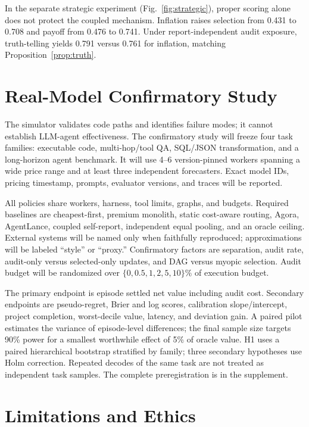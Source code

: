 \documentclass[sigconf,anonymous,review]{acmart}
\begin{document}
In the separate strategic experiment (Fig.~\ref{fig:strategic}), proper scoring
alone does not protect the coupled mechanism. Inflation raises selection from
0.431 to 0.708 and payoff from 0.476 to 0.741. Under report-independent audit
exposure, truth-telling yields 0.791 versus 0.761 for inflation, matching
Proposition~\ref{prop:truth}.

\section{Real-Model Confirmatory Study}

The simulator validates code paths and identifies failure modes; it cannot
establish LLM-agent effectiveness. The confirmatory study will freeze four task
families: executable code, multi-hop/tool QA, SQL/JSON transformation, and a
long-horizon agent benchmark. It will use 4--6 version-pinned workers spanning a
wide price range and at least three independent forecasters. Exact model IDs,
pricing timestamp, prompts, evaluator versions, and traces will be reported.

All policies share workers, harness, tool limits, graphs, and budgets. Required
baselines are cheapest-first, premium monolith, static cost-aware routing, Agora,
AgentLance, coupled self-report, independent equal pooling, and an oracle ceiling.
External systems will be named only when faithfully reproduced; approximations
will be labeled ``style'' or ``proxy.'' Confirmatory factors are separation,
audit rate, audit-only versus selected-only updates, and DAG versus myopic
selection. Audit budget will be randomized over
$\{0,0.5,1,2,5,10\}\%$ of execution budget.

The primary endpoint is episode settled net value including audit cost. Secondary
endpoints are pseudo-regret, Brier and log scores, calibration slope/intercept,
project completion, worst-decile value, latency, and deviation gain. A paired
pilot estimates the variance of episode-level differences; the final sample size
targets 90\% power for a smallest worthwhile effect of 5\% of oracle value. H1
uses a paired hierarchical bootstrap stratified by family; three secondary
hypotheses use Holm correction. Repeated decodes of the same task are not treated
as independent task samples. The complete preregistration is in the supplement.

\section{Limitations and Ethics}
\end{document}
